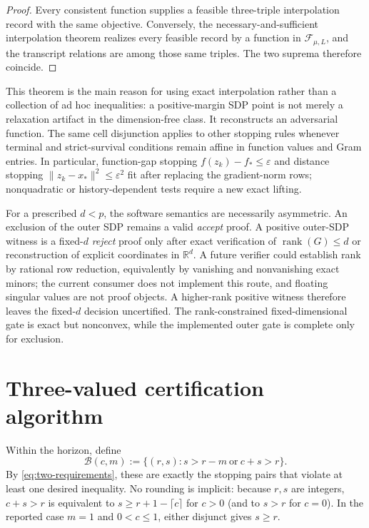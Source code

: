 \documentclass[smallextended]{svjour3}
\newcommand{\R}{\mathbb{R}}
\newcommand{\cF}{\mathcal{F}}
\newcommand{\norm}[1]{\lVert #1\rVert}
\newcommand{\eps}{\varepsilon}
\DeclareMathOperator{\rank}{rank}
\begin{document}
\begin{proof}
Every consistent function supplies a feasible three-triple interpolation
record with the same objective.  Conversely, the necessary-and-sufficient
interpolation theorem \citep[Thm.~4]{TaylorInterpolation2017} realizes every
feasible record by a function in $\cF_{\mu,L}$, and the transcript relations
are among those same triples.  The two suprema therefore coincide.
\end{proof}

This theorem is the main reason for using exact interpolation rather than a
collection of ad hoc inequalities: a positive-margin SDP point is not merely a
relaxation artifact in the dimension-free class.  It reconstructs an
adversarial function.  The same cell disjunction applies to other stopping
rules whenever terminal and strict-survival conditions remain affine in
function values and Gram entries.  In particular, function-gap stopping
$f(z_k)-f_*\leq\eps$ and distance stopping
$\norm{z_k-x_*}^2\leq\eps^2$ fit after replacing the gradient-norm rows;
nonquadratic or history-dependent tests require a new exact lifting.

For a prescribed $d<p$, the software semantics are necessarily asymmetric.
An exclusion of the outer SDP remains a valid \emph{accept} proof.  A positive
outer-SDP witness is a fixed-$d$ \emph{reject} proof only after exact
verification of $\rank(G)\leq d$ or reconstruction of explicit coordinates
in $\R^d$.  A future verifier could establish rank by rational row reduction,
equivalently by vanishing and nonvanishing exact minors; the current consumer
does not implement this route, and floating singular values are not proof
objects.  A higher-rank positive witness therefore leaves
the fixed-$d$ decision uncertified.  The rank-constrained fixed-dimensional
gate is exact but nonconvex, while the implemented outer gate is complete only
for exclusion.

\section{Three-valued certification algorithm}
\label{sec:bad-cells}

Within the horizon, define
\begin{equation}
 \mathcal B(c,m):=\{(r,s):s>r-m\ \text{or}\ c+s>r\}.   \label{eq:bad}
\end{equation}
By \eqref{eq:two-requirements}, these are exactly the stopping pairs that
violate at least one desired inequality.  No rounding is implicit: because
$r,s$ are integers, $c+s>r$ is equivalent to
$s\geq r+1-\lceil c\rceil$ for $c>0$ (and to $s>r$ for $c=0$).  In the
reported case $m=1$ and $0<c\leq1$, either disjunct gives $s\geq r$.
\end{document}
